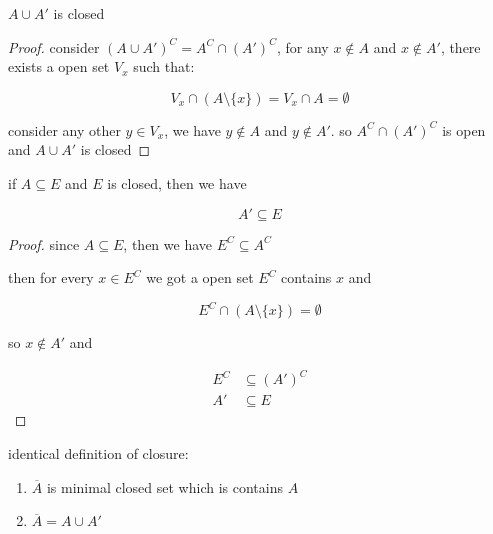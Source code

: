 \documentclass[11pt,a4paper]{book}
\begin{document}
\begin{lem}
    $A \cup A'$ is closed
\end{lem}

\begin{proof}
    consider $(A \cup A')^C = A^C \cap (A')^C$, for any $x \notin A$ and $x \notin A'$, there exists 
    a open set $V_x$ such that:

    \[
        V_x \cap (A \setminus \{ x \}) = V_x \cap A = \emptyset
    \]

    consider any other $y \in V_x$, we have $y \notin A$ and $y \notin A'$. so $A^C \cap (A')^C$ is open 
    and $A \cup A'$ is closed
\end{proof}


\begin{lem}
    if $A \subseteq E$ and $E$ is closed, then we have

    \[
        A' \subseteq E
    \]
\end{lem}

\begin{proof}
    since $A \subseteq E$, then we have $E^C \subseteq A^C$

    then for every $x \in E^C$ we got a open set $E^C$ contains $x$ and

    \[
        E^C \cap (A \setminus \{ x \}) = \emptyset
    \]

    so $x \notin A'$  and

    \begin{align*}
        E^C & \subseteq (A')^C \\
        A' & \subseteq E
    \end{align*}
\end{proof}

\begin{lem}
    identical definition of closure: 

    \begin{enumerate}
        \item $\overline{A}$ is minimal closed set which is contains $A$
        \item $\overline{A} = A \cup A'$
    \end{enumerate}
\end{lem}
\end{document}
